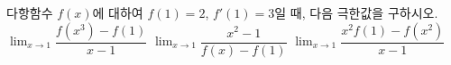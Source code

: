 다항함수 $f(x)$에 대하여 $f(1)=2$, $f'(1)=3$일 때, 다음 극한값을 구하시오.
 $\displaystyle\lim_{x\to 1}\dfrac{f(x^3)-f(1)}{x-1}$
 $\displaystyle\lim_{x\to 1}\dfrac{x^2-1}{f(x)-f(1)}$
 $\displaystyle\lim_{x\to 1}\dfrac{x^2f(1)-f(x^2)}{x-1}$
